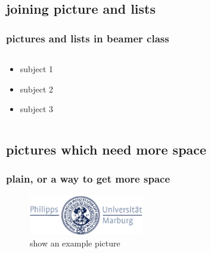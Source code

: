 \documentclass[11pt]{beamer}
\begin{document}
    \subsection{joining picture and lists}

    \begin{frame}
        \frametitle{pictures and lists in beamer class}
        \begin{columns}
            \begin{column}{5cm}
                \begin{itemize}
                    \item<1-> subject 1
                    \item<3-> subject 2
                    \item<5-> subject 3
                \end{itemize}
                \vspace{3cm}
            \end{column}
            \begin{column}{5cm}
            \end{column}
        \end{columns}
    \end{frame}


    \subsection{pictures which need more space}
    \begin{frame}[plain]
        \frametitle{plain, or a way to get more space}
        \begin{figure}
            \includegraphics[width=5cm]{gfx/logo_blue}
            \caption{show an example picture}
        \end{figure}
    \end{frame}
\end{document}
